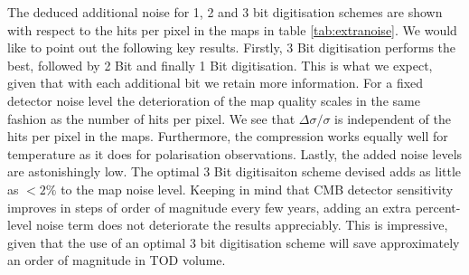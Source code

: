 \documentclass[apj]{emulateapj}
\begin{document}

The deduced additional noise for 1, 2 and 3 bit digitisation schemes are shown with respect to the hits per pixel in the maps in table \ref{tab:extranoise}. We would like to point out the following key results. Firstly, 3 Bit digitisation performs the best, followed by 2 Bit and finally 1 Bit digitisation. This is what we expect, given that with each additional bit we retain more information. For a fixed detector noise level the deterioration of the map quality scales in the same fashion as the number of hits per pixel. We see that $\Delta \sigma / \sigma$ is independent of the hits per pixel in the maps. Furthermore, the compression works equally well for temperature as it does for polarisation observations. Lastly, the added noise levels are astonishingly low. The optimal 3 Bit digitisaiton scheme devised adds as little as $<2\%$ to the map noise level. Keeping in mind that CMB detector sensitivity improves in steps of order of magnitude every few years, adding an extra percent-level noise term does not deteriorate the results appreciably. This is impressive, given that the use of an optimal 3 bit digitisation scheme will save approximately an order of magnitude in TOD volume.
\end{document}

